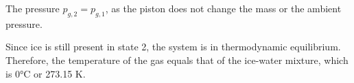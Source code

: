 The pressure \( p_{g,2} = p_{g,1} \), as the piston does not change the mass or the ambient pressure.  

Since ice is still present in state 2, the system is in thermodynamic equilibrium. Therefore, the temperature of the gas equals that of the ice-water mixture, which is 0°C or 273.15 K.